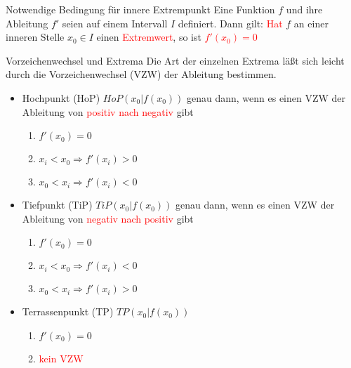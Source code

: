  \begin{satz}{Notwendige Bedingung für innere Extrempunkt}{}
   Eine Funktion $f$ und ihre Ableitung $f'$ seien auf einem Intervall $I$ definiert. Dann gilt: \textcolor{red}{Hat} $f$ an einer inneren Stelle $x_0\in I$ einen \textcolor{red}{Extremwert}, so ist \textcolor{red}{$f'(x_0)=0$}
 \end{satz}
 \begin{b8d}{Vorzeichenwechsel und Extrema}{}
 Die Art der einzelnen Extrema läßt sich leicht durch die Vorzeichenwechsel (VZW) der Ableitung bestimmen.
 \begin{itemize}
\item Hochpunkt (HoP) $HoP(x_0|f(x_0))$ genau dann, wenn es einen VZW der Ableitung von \textcolor{red}{positiv nach negativ} gibt
\begin{enumerate}
    \item $f'(x_0) = 0$
    \item $x_i<x_0 \Rightarrow f'(x_i)>0$
    \item $x_0 <x_i \Rightarrow f'(x_i)<0$
\end{enumerate}
\item Tiefpunkt (TiP) $TiP(x_0|f(x_0))$ genau dann, wenn es einen VZW der Ableitung von \textcolor{red}{negativ nach positiv} gibt
\begin{enumerate}
    \item $f'(x_0) = 0$
    \item $x_i<x_0 \Rightarrow f'(x_i)<0$
    \item $x_0 <x_i \Rightarrow f'(x_i)>0$
\end{enumerate}
\item Terrassenpunkt (TP) $TP(x_0|f(x_0))$
\begin{enumerate}
    \item $f'(x_0) = 0$
    \item \textcolor{red}{kein VZW}
\end{enumerate}
 \end{itemize}
 \end{b8d}
